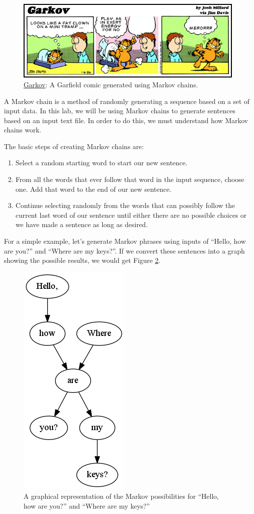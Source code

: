 \documentclass[11pt]{cselabheader}
\begin{document}
\begin{figure}
  \centering
  \includegraphics[width=\linewidth]{img/garkov}
  \caption{\href{http://joshmillard.com/garkov/}{Garkov}: A Garfield comic generated using Markov chains.}
  \label{garkov}
\end{figure}

A Markov chain is a method of randomly generating a sequence based on a set of input data. In this lab, we will be using Markov chains to generate sentences based on an input text file. In order to do this, we must understand how Markov chains work.

The basic steps of creating Markov chains are:
\begin{enumerate}
\item Select a random starting word to start our new sentence.
\item From all the words that ever follow that word in the input sequence, choose one. Add that word to the end of our new sentence.
\item Continue selecting randomly from the words that can possibly follow the current last word of our sentence until either there are no possible choices or we have made a sentence as long as desired.
\end{enumerate}

For a simple example, let's generate Markov phrases using inputs of ``Hello, how are you?'' and ``Where are my keys?''. If we convert these sentences into a graph showing the possible results, we would get Figure \ref{mark_ex}.

\begin{figure}[h]
  \centering
  \includegraphics[width=0.2\linewidth]{lab10/example}
  \caption{A graphical representation of the Markov possibilities for ``Hello, how are you?'' and ``Where are my keys?''}
  \label{mark_ex}
\end{figure}
\end{document}
